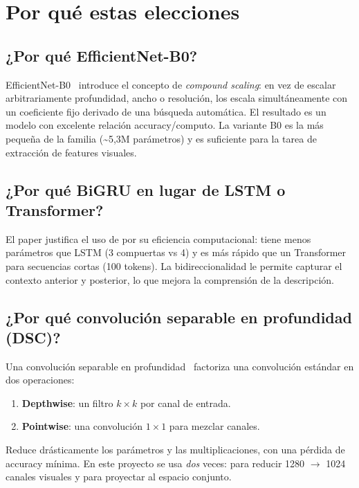 \section{Por qué estas elecciones}

\subsection*{¿Por qué EfficientNet-B0?}

EfficientNet-B0~\cite{tan2019efficientnet} introduce el concepto de
\emph{compound scaling}: en vez de escalar arbitrariamente
profundidad, ancho o resolución, los escala simultáneamente con un
coeficiente fijo derivado de una búsqueda automática. El resultado
es un modelo con excelente relación accuracy/computo. La variante
B0 es la más pequeña de la familia (\textasciitilde 5,3M parámetros)
y es suficiente para la tarea de extracción de features visuales.

\subsection*{¿Por qué BiGRU en lugar de LSTM o Transformer?}

El paper justifica el uso de \gru{} por su eficiencia computacional:
tiene menos parámetros que LSTM (3 compuertas vs 4) y es más rápido
que un Transformer para secuencias cortas (100 tokens). La
bidireccionalidad le permite capturar el contexto anterior y
posterior, lo que mejora la comprensión de la descripción.

\subsection*{¿Por qué convolución separable en profundidad (DSC)?}

Una convolución separable en profundidad~\cite{howard2017mobilenets}
factoriza una convolución estándar en dos operaciones:

\begin{enumerate}
  \item \textbf{Depthwise}: un filtro $k \times k$ por canal de
        entrada.
  \item \textbf{Pointwise}: una convolución $1 \times 1$ para
        mezclar canales.
\end{enumerate}

\noindent Reduce drásticamente los parámetros y las
multiplicaciones, con una pérdida de accuracy mínima. En este
proyecto se usa \emph{dos} veces: para reducir 1280 $\to$ 1024
canales visuales y para proyectar al espacio conjunto.

